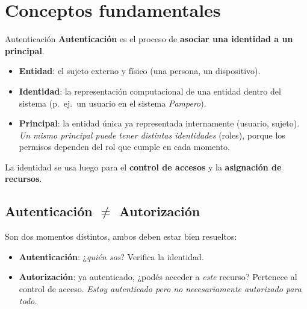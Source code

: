 \documentclass[11pt,a4paper]{article}
\begin{document}
\section{Conceptos fundamentales}

\begin{defbox}{Autenticación}
\textbf{Autenticación} es el proceso de \textbf{asociar una identidad a un principal}.
\begin{itemize}[leftmargin=1.4em,itemsep=2pt]
  \item \textbf{Entidad}: el sujeto externo y físico (una persona, un dispositivo).
  \item \textbf{Identidad}: la representación computacional de una entidad dentro del
        sistema (p.\ ej.\ un usuario en el sistema \emph{Pampero}).
  \item \textbf{Principal}: la entidad única ya representada internamente (usuario, sujeto).
        \emph{Un mismo principal puede tener distintas identidades} (roles), porque los
        permisos dependen del rol que cumple en cada momento.
\end{itemize}
La identidad se usa luego para el \textbf{control de accesos} y la \textbf{asignación de
recursos}.
\end{defbox}

\subsection{Autenticación ${\neq}$ Autorización}
Son dos momentos distintos, ambos deben estar bien resueltos:
\begin{itemize}[leftmargin=1.4em]
  \item \textbf{Autenticación}: ¿\emph{quién sos}? Verifica la identidad.
  \item \textbf{Autorización}: ya autenticado, ¿podés acceder a \emph{este} recurso?
        Pertenece al control de acceso. \emph{Estoy autenticado pero no necesariamente
        autorizado para todo.}
\end{itemize}
\end{document}
